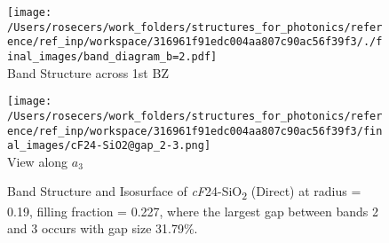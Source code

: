 \begin{figure}[H]
\begin{minipage}{0.5\textwidth}\centering
\texttt{[image: /Users/rosecers/work\_folders/structures\_for\_photonics/reference/ref\_inp/workspace/316961f91edc004aa807c90ac56f39f3/./final\_images/band\_diagram\_b=2.pdf]}
\\Band Structure across 1st BZ
\end{minipage}\hfill
\begin{minipage}{0.48\textwidth}\centering
\texttt{[image: /Users/rosecers/work\_folders/structures\_for\_photonics/reference/ref\_inp/workspace/316961f91edc004aa807c90ac56f39f3/final\_images/cF24-SiO2@gap\_2-3.png]}
\\View along $a_3$ 
\end{minipage}\hfill\caption{Band Structure and Isosurface of \textit{cF}24-SiO\textsubscript{2} (Direct) at radius = 0.19, filling fraction = 0.227, where the largest gap between bands 2 and 3 occurs with gap size 31.79\%.}

\end{figure}
\vspace{-0.25in}

